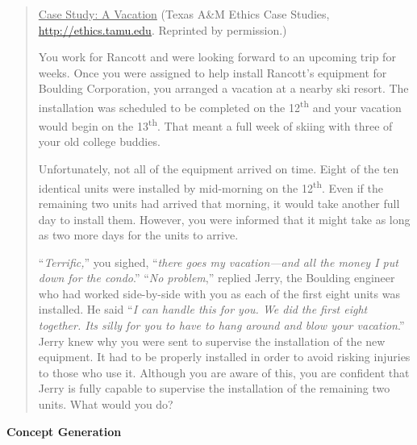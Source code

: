 \begin{quote}
\ul{Case Study: A Vacation} (Texas A\&M Ethics Case Studies,
\url{http://ethics.tamu.edu}. Reprinted by permission.)

You work for Rancott and were looking forward to an upcoming trip for
weeks. Once you were assigned to help install Rancott's equipment for
Boulding Corporation, you arranged a vacation at a nearby ski resort.
The installation was scheduled to be completed on the
12\textsuperscript{th} and your vacation would begin on the
13\textsuperscript{th}. That meant a full week of skiing with three of
your old college buddies.

Unfortunately, not all of the equipment arrived on time. Eight of the
ten identical units were installed by mid-morning on the
12\textsuperscript{th}. Even if the remaining two units had arrived that
morning, it would take another full day to install them. However, you
were informed that it might take as long as two more days for the units
to arrive.

``\emph{Terrific,}'' you sighed, ``\emph{there goes my vacation---and
all the money I put down for the condo}.'' ``\emph{No problem},''
replied Jerry, the Boulding engineer who had worked side-by-side with
you as each of the first eight units was installed. He said ``\emph{I
can handle this for you. We did the first eight together.
It\textquotesingle s silly for you to have to hang around and blow your
vacation}.'' Jerry knew why you were sent to supervise the installation
of the new equipment. It had to be properly installed in order to avoid
risking injuries to those who use it. Although you are aware of this,
you are confident that Jerry is fully capable to supervise the
installation of the remaining two units. What would you do?
\end{quote}

\textbf{Concept Generation}
